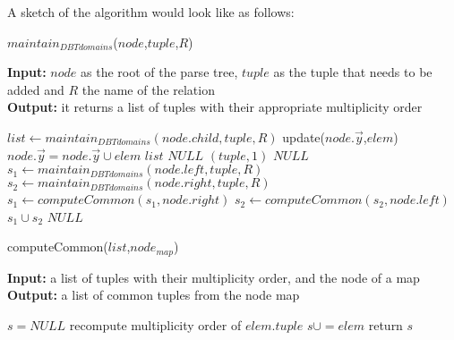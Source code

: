 \documentclass[12pt]{article}
\begin{document}
A sketch of the algorithm would look like as follows:

\begin{algorithm}[H]
\caption{$maintain_{DBTdomains}$($node$,$tuple$,$R$)} 
\label{alg2}
\textbf{Input:} $node$ as the root of the parse tree, $tuple$ as the tuple that needs to be added and $R$ the name of the relation \\
\textbf{Output:} it returns a list of tuples with their appropriate multiplicity order\\
\begin{algorithmic}[1]
\STATE $list\gets maintain_{DBTdomains}(node.child,tuple,R)$
\STATE update($node.\vec{y}$,$elem$)
\ELSE
\STATE $node.\vec{y}=node.\vec{y} \cup elem$
\ENDIF
\ENDFOR
\RETURN  $list$
\ENDIF
\RETURN  $NULL$
\RETURN  $(tuple,1)$
\ENDIF
\RETURN $NULL$
\STATE $s_{1}\gets maintain_{DBTdomains}(node.left,tuple,R)$
\STATE $s_{2}\gets maintain_{DBTdomains}(node.right,tuple,R)$
\STATE $s_{1}\gets computeCommon(s_{1},node.right)$
\STATE $s_{2}\gets computeCommon(s_{2},node.left)$
\ENDIF
\RETURN  $s_{1}\cup s_{2}$
\ENDIF
\RETURN $NULL$
\end{algorithmic}
\end{algorithm}

\begin{algorithm}[H]
\caption{computeCommon($list$,$node_{map}$)}
\label{alg4}
\textbf{Input:} a list of tuples with their multiplicity order, and the node of a map\\
\textbf{Output:} a list of common tuples from the node map\\
\begin{algorithmic}[1]
\STATE $s=NULL$
\STATE recompute multiplicity order of $elem.tuple$
\STATE $s\cup=elem$
\ENDIF
\ENDFOR
\ENDIF
\STATE return $s$
\end{algorithmic}
\end{algorithm}
\end{document}
